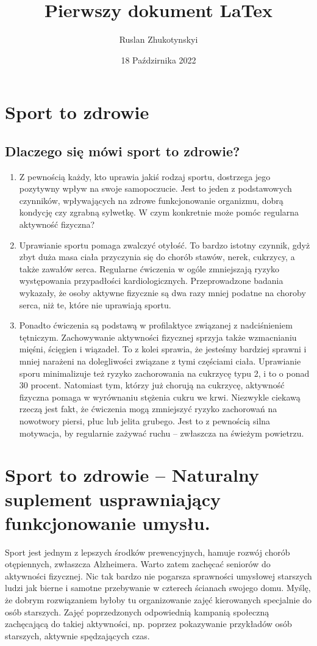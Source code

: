 \documentclass[12pt, letterpaper, titlepage]{article}
\title{Pierwszy dokument LaTex}
\author{Ruslan Zhukotynskyi}
\date{18 Paździrnika 2022}
\begin{document}
\maketitle
\section{Sport to zdrowie}
\subsection{Dlaczego się mówi sport to zdrowie?}
\begin{enumerate}
\item Z pewnością każdy, kto uprawia jakiś rodzaj sportu, dostrzega jego pozytywny wpływ na swoje samopoczucie. Jest to jeden z podstawowych czynników, wpływających na zdrowe funkcjonowanie organizmu, dobrą kondycję czy zgrabną sylwetkę. W czym konkretnie może pomóc regularna aktywność fizyczna?
\item Uprawianie sportu pomaga zwalczyć otyłość. To bardzo istotny czynnik, gdyż zbyt duża masa ciała przyczynia się do chorób stawów, nerek, cukrzycy, a także zawałów serca. Regularne ćwiczenia w ogóle zmniejszają ryzyko występowania przypadłości kardiologicznych. Przeprowadzone badania wykazały, że osoby aktywne fizycznie są dwa razy mniej podatne na choroby serca, niż te, które nie uprawiają sportu.
\item Ponadto ćwiczenia są podstawą w profilaktyce związanej z nadciśnieniem tętniczym. Zachowywanie aktywności fizycznej sprzyja także wzmacnianiu mięśni, ścięgien i wiązadeł. To z kolei sprawia, że jesteśmy bardziej sprawni i mniej narażeni na dolegliwości związane z tymi częściami ciała. Uprawianie sporu minimalizuje też ryzyko zachorowania na cukrzycę typu 2, i to o ponad 30 procent. Natomiast tym, którzy już chorują na cukrzycę, aktywność fizyczna pomaga w wyrównaniu stężenia cukru we krwi. Niezwykle ciekawą rzeczą jest fakt, że ćwiczenia mogą zmniejszyć ryzyko zachorowań na nowotwory piersi, płuc lub jelita grubego. Jest to z pewnością silna motywacja, by regularnie zażywać ruchu – zwłaszcza na świeżym powietrzu.
\end{enumerate}
\section{Sport to zdrowie – Naturalny suplement usprawniający funkcjonowanie umysłu.}
Sport jest jednym z lepszych środków prewencyjnych, hamuje rozwój chorób otępiennych, zwłaszcza Alzheimera. Warto zatem zachęcać seniorów do aktywności fizycznej. Nic tak bardzo nie pogarsza sprawności umysłowej starszych ludzi jak bierne i samotne przebywanie w czterech ścianach swojego domu. Myślę, że dobrym rozwiązaniem byłoby tu organizowanie zajęć kierowanych specjalnie do osób starszych. Zajęć poprzedzonych odpowiednią kampanią społeczną zachęcającą do takiej aktywności, np. poprzez pokazywanie przykładów osób starszych, aktywnie spędzających czas.
\newpage
\end{document}
